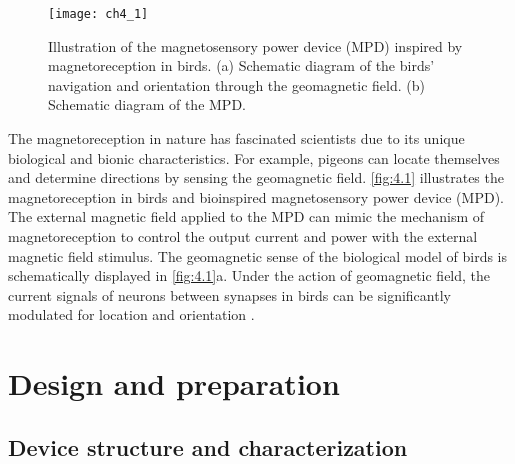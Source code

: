 \begin{figure}[H] 
\centering    
\texttt{[image: ch4\_1]}
\caption[Illustration of the magnetosensory power device (MPD) inspired by magnetoreception in birds]{Illustration of the magnetosensory power device (MPD) inspired by magnetoreception in birds. (a) Schematic diagram of the birds’ navigation and orientation through the geomagnetic field. (b) Schematic diagram of the MPD.}
\label{fig:4.1}
\end{figure}

The  magnetoreception  in nature has fascinated scientists due to its unique biological and bionic  characteristics. For example, pigeons can locate themselves and determine directions by sensing the geomagnetic field. \autoref{fig:4.1} illustrates the magnetoreception in birds and bioinspired magnetosensory power device (MPD). The external magnetic field applied to the MPD can mimic the mechanism of magnetoreception to control the output current and power with the external magnetic field stimulus. The geomagnetic sense of the biological model of birds is schematically displayed in \autoref{fig:4.1}a. Under the action of geomagnetic field, the current signals of neurons between synapses in birds can be significantly modulated for location and orientation \cite{zhang2020strain}. 


\section{Design and preparation}
\label{sec:Design and preparation}

\subsection{Device structure and characterization}
\label{sec:Device structure and characterization}

